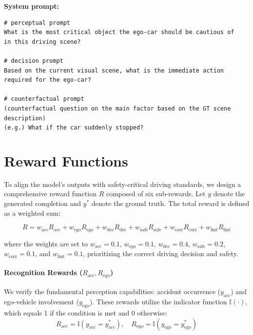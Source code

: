 \documentclass{article}
\begin{document}
\begin{tcolorbox}[title=Token Activation Map Analysis Prompts, breakable]
\small
\textbf{System prompt:}
\begin{verbatim}
# perceptual prompt
What is the most critical object the ego-car should be cautious of 
in this driving scene? 

# decision prompt 
Based on the current visual scene, what is the immediate action 
required for the ego-car?

# counterfactual prompt
(counterfactual question on the main factor based on the GT scene description)
(e.g.) What if the car suddenly stopped?
\end{verbatim}
\end{tcolorbox}

\clearpage
\section{Reward Functions}
\label{appendix:reward_functions}
To align the model's outputs with safety-critical driving standards, we design a comprehensive reward function $R$ composed of six sub-rewards. Let $y$ denote the generated completion and $y^*$ denote the ground truth. The total reward is defined as a weighted sum:

\begin{equation}
    R = w_{\text{acc}} R_{\text{acc}} + w_{\text{ego}} R_{\text{ego}} + w_{\text{dec}} R_{\text{dec}} + w_{\text{safe}} R_{\text{safe}} + w_{\text{corr}} R_{\text{corr}} + w_{\text{fmt}} R_{\text{fmt}}
\label{eq:total_reward}
\end{equation}

\noindent where the weights are set to $w_{\text{acc}}=0.1$, $w_{\text{ego}}=0.1$, $w_{\text{dec}}=0.4$, $w_{\text{safe}}=0.2$, $w_{\text{corr}}=0.1$, and $w_{\text{fmt}}=0.1$, prioritizing the correct driving decision and safety.

\paragraph{Recognition Rewards ($R_{\text{acc}}, R_{\text{ego}}$)}
We verify the fundamental perception capabilities: accident occurrence ($y_{\text{acc}}$) and ego-vehicle involvement ($y_{\text{ego}}$). These rewards utilize the indicator function $\mathbb{I}(\cdot)$, which equals 1 if the condition is met and 0 otherwise:
\begin{equation}
    R_{\text{acc}} = \mathbb{I}(y_{\text{acc}} = y^*_{\text{acc}}), \quad R_{\text{ego}} = \mathbb{I}(y_{\text{ego}} = y^*_{\text{ego}})
\end{equation}
\end{document}

